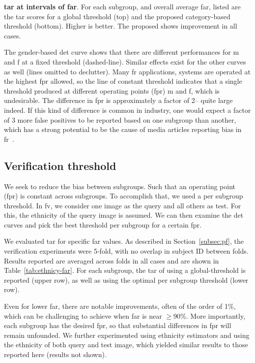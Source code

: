  
\begin{table}[t!]
\caption{\small{\textbf{\gls{tar} at intervals of \gls{far}}. For each subgroup, and overall average \gls{far}, listed are the \gls{tar} scores for a global threshold (top) and the proposed category-based threshold (bottom). Higher is better. The proposed shows improvement in all cases.}}\label{tab:ethnicy-far} 

\end{table}


The gender-based \gls{det} curve shows that there are different performances for \gls{m} and \gls{f} at a fixed threshold (dashed-line). Similar effects exist for the other curves as well (lines omitted to declutter). Many \gls{fr} applications, systems are operated at the highest \gls{fpr} allowed, so the line of constant threshold indicates that a single threshold produced at different operating points (\ie \gls{fpr}) \gls{m} and \gls{f}, which is undesirable.  The difference in \gls{fpr} is approximately a factor of 2-- quite large indeed. If this kind of difference is common in industry, one would expect a factor of 3 more false positives to be reported based on one subgroup than another, which has a strong potential to be the cause of media articles reporting bias in 
\gls{fr}~\cite{england2019,snow2018}.


\subsection{Verification threshold} \label{subsec:analysis:verification}
We seek to reduce the bias between subgroups. Such that an operating point (\ie \gls{fpr}) is constant across subgroups. To accomplish that, we used a per subgroup threshold. In \gls{fv}, we consider one image as the query and all others as test. For this, the ethnicity of the query image is assumed. We can then examine the \gls{det} curves and pick the best threshold per subgroup for a certain \gls{fpr}.

We evaluated \gls{tar} for specific \gls{far} values. As described in Section~\ref{subsec:pf}, the verification experiments were 5-fold, with no overlap in subject ID between folds. Results reported are averaged across folds in all cases and are shown in Table~\ref{tab:ethnicy-far}. For each subgroup, the \gls{tar} of using a global-threshold is reported (upper row), as well as using the optimal per subgroup threshold (lower row). 

Even for lower \gls{far}, there are notable improvements, often of the order of 1\%, which can be challenging to achieve when \gls{far} is near $\geq$90\%. More importantly, each subgroup has the desired \gls{fpr}, so that substantial differences in \gls{fpr} will remain unfounded. We further experimented using ethnicity estimators and using the ethnicity of both query and test image, which yielded similar results to those reported here (results not shown).

